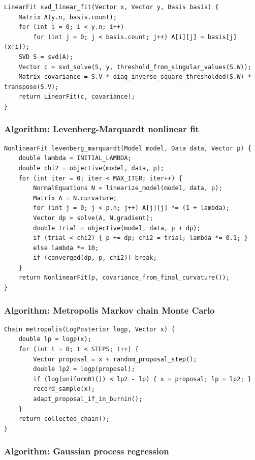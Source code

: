 \documentclass[11pt]{article}
\begin{document}
\begin{verbatim}
LinearFit svd_linear_fit(Vector x, Vector y, Basis basis) {
    Matrix A(y.n, basis.count);
    for (int i = 0; i < y.n; i++)
        for (int j = 0; j < basis.count; j++) A[i][j] = basis[j](x[i]);
    SVD S = svd(A);
    Vector c = svd_solve(S, y, threshold_from_singular_values(S.W));
    Matrix covariance = S.V * diag_inverse_square_thresholded(S.W) * transpose(S.V);
    return LinearFit(c, covariance);
}
\end{verbatim}

\subsubsection{Algorithm: Levenberg-Marquardt nonlinear fit}\label{algorithm-levenberg-marquardt-nonlinear-fit}

\begin{verbatim}
NonlinearFit levenberg_marquardt(Model model, Data data, Vector p) {
    double lambda = INITIAL_LAMBDA;
    double chi2 = objective(model, data, p);
    for (int iter = 0; iter < MAX_ITER; iter++) {
        NormalEquations N = linearize_model(model, data, p);
        Matrix A = N.curvature;
        for (int j = 0; j < p.n; j++) A[j][j] *= (1 + lambda);
        Vector dp = solve(A, N.gradient);
        double trial = objective(model, data, p + dp);
        if (trial < chi2) { p += dp; chi2 = trial; lambda *= 0.1; }
        else lambda *= 10;
        if (converged(dp, p, chi2)) break;
    }
    return NonlinearFit(p, covariance_from_final_curvature());
}
\end{verbatim}

\subsubsection{Algorithm: Metropolis Markov chain Monte Carlo}\label{algorithm-metropolis-markov-chain-monte-carlo}

\begin{verbatim}
Chain metropolis(LogPosterior logp, Vector x) {
    double lp = logp(x);
    for (int t = 0; t < STEPS; t++) {
        Vector proposal = x + random_proposal_step();
        double lp2 = logp(proposal);
        if (log(uniform01()) < lp2 - lp) { x = proposal; lp = lp2; }
        record_sample(x);
        adapt_proposal_if_in_burnin();
    }
    return collected_chain();
}
\end{verbatim}

\subsubsection{Algorithm: Gaussian process regression}\label{algorithm-gaussian-process-regression}
\end{document}
